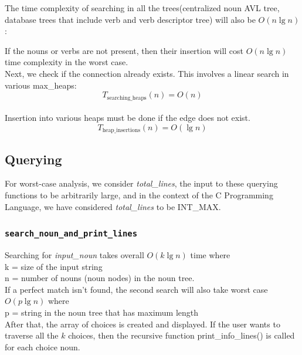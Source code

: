 \documentclass[conference]{IEEEtran}
\begin{document}
The time complexity of searching in all the trees(centralized noun AVL tree, database trees that include verb and verb descriptor tree) will also be $O(n \lg n)$:

If the nouns or verbs are not present, then their insertion will cost $O(n \lg n)$ time complexity in the worst case.
\\
Next, we check if the connection already exists. This involves a linear search in various max\_heaps:
\begin{equation}
	T_{\text{searching\_heaps}}(n) = O(n)
\end{equation}
\\
Insertion into various heaps must be done if the edge does not exist.
\begin{equation}
	T_{\text{heap\_insertions}}(n) = O(\lg n)
\end{equation}


\subsection{\textbf{Querying}}

For worst-case analysis, we consider \textit{total\_lines}, the input to these querying functions to be arbitrarily large, and in the context of the C Programming Language, we have considered \textit{total\_lines} to be INT\_MAX.


\subsubsection{\textbf{\texttt{search\_noun\_and\_print\_lines}}}
    Searching for \textit{input\_noun} takes overall $O(k \lg n)$  time where 
    \\k = size of the input string
    \\n = number of nouns (noun nodes) in the noun tree.
    \\If a perfect match isn’t found, the second search will also
take worst case  $O(p \lg n)$ where
    \\p = string in the noun tree that has maximum length
    \\After that, the array of choices is created and displayed. If
the user wants to traverse all the $k$ choices, then the recursive function print\_info\_lines() is called for each choice noun.
\end{document}
